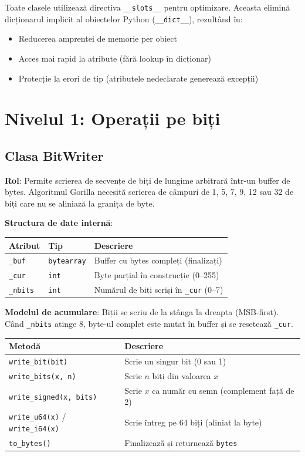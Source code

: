 Toate clasele utilizează directiva \texttt{\_\_slots\_\_} pentru optimizare. Aceasta elimină dicționarul implicit al obiectelor Python (\texttt{\_\_dict\_\_}), rezultând în:
\begin{itemize}
    \item Reducerea amprentei de memorie per obiect
    \item Acces mai rapid la atribute (fără lookup în dicționar)
    \item Protecție la erori de tip (atributele nedeclarate generează excepții)
\end{itemize}

\section{Nivelul 1: Operații pe biți}

\subsection{Clasa BitWriter}

\textbf{Rol}: Permite scrierea de secvențe de biți de lungime arbitrară într-un buffer de bytes. Algoritmul Gorilla necesită scrierea de câmpuri de 1, 5, 7, 9, 12 sau 32 de biți care nu se aliniază la granița de byte.

\textbf{Structura de date internă}:
\begin{center}
\begin{tabular}{|l|l|p{7cm}|}
\hline
\textbf{Atribut} & \textbf{Tip} & \textbf{Descriere} \\
\hline
\texttt{\_buf} & \texttt{bytearray} & Buffer cu bytes compleți (finalizați) \\
\texttt{\_cur} & \texttt{int} & Byte parțial în construcție (0--255) \\
\texttt{\_nbits} & \texttt{int} & Numărul de biți scriși în \texttt{\_cur} (0--7) \\
\hline
\end{tabular}
\end{center}

\textbf{Modelul de acumulare}: Biții se scriu de la stânga la dreapta (MSB-first). Când \texttt{\_nbits} atinge 8, byte-ul complet este mutat în buffer și se resetează \texttt{\_cur}.

\begin{center}
\begin{tabular}{|l|p{8cm}|}
\hline
\textbf{Metodă} & \textbf{Descriere} \\
\hline
\texttt{write\_bit(bit)} & Scrie un singur bit (0 sau 1) \\
\texttt{write\_bits(x, n)} & Scrie $n$ biți din valoarea $x$ \\
\texttt{write\_signed(x, bits)} & Scrie $x$ ca număr cu semn (complement față de 2) \\
\texttt{write\_u64(x)} / \texttt{write\_i64(x)} & Scrie întreg pe 64 biți (aliniat la byte) \\
\texttt{to\_bytes()} & Finalizează și returnează \texttt{bytes} \\
\hline
\end{tabular}
\end{center}

